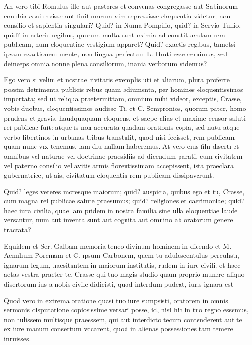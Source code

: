  An vero tibi Romulus ille aut pastores et convenas congregasse aut Sabinorum conubia coniunxisse aut finitimorum vim repressisse eloquentia videtur, non consilio et sapientia singulari? Quid? in Numa Pompilio, quid? in Servio Tullio, quid? in ceteris regibus, quorum multa sunt eximia ad constituendam rem publicam, num eloquentiae vestigium apparet? Quid? exactis regibus, tametsi ipsam exactionem mente, non lingua perfectam L. Bruti esse cernimus, sed deinceps omnia nonne plena consiliorum, inania verborum videmus?

 Ego vero si velim et nostrae civitatis exemplis uti et aliarum, plura proferre possim detrimenta publicis rebus quam adiumenta, per homines eloquentissimos importata; sed ut reliqua praetermittam, omnium mihi videor, exceptis, Crasse, vobis duobus, eloquentissimos audisse Ti. et C. Sempronios, quorum pater, homo prudens et gravis, haudquaquam eloquens, et saepe alias et maxime censor saluti rei publicae fuit: atque is non accurata quadam orationis copia, sed nutu atque verbo libertinos in urbanas tribus transtulit, quod nisi fecisset, rem publicam, quam nunc vix tenemus, iam diu nullam haberemus. At vero eius filii diserti et omnibus vel naturae vel doctrinae praesidiis ad dicendum parati, cum civitatem vel paterno consilio vel avitis armis florentissimam accepissent, ista praeclara gubernatrice, ut ais, civitatum eloquentia rem publicam dissipaverunt.

 Quid? leges veteres moresque maiorum; quid? auspicia, quibus ego et tu, Crasse, cum magna rei publicae salute praesumus; quid? religiones et caerimoniae; quid? haec iura civilia, quae iam pridem in nostra familia sine ulla eloquentiae laude versantur, num aut inventa sunt aut cognita aut omnino ab oratorum genere tractata?

 Equidem et Ser. Galbam memoria teneo divinum hominem in dicendo et M. Aemilium Porcinam et C. ipsum Carbonem, quem tu adulescentulus perculisti, ignarum legum, haesitantem in maiorum institutis, rudem in iure civili; et haec aetas vestra praeter te, Crasse qui tuo magis studio quam proprio munere aliquo disertorum ius a nobis civile didicisti, quod interdum pudeat, iuris ignara est.

 Quod vero in extrema oratione quasi tuo iure sumpsisti, oratorem in omnis sermonis disputatione copiosissime versari posse, id, nisi hic in tuo regno essemus, non tulissem multisque praeessem, qui aut interdicto tecum contenderent aut te ex iure manum consertum vocarent, quod in alienas possessiones tam temere inruisses.

